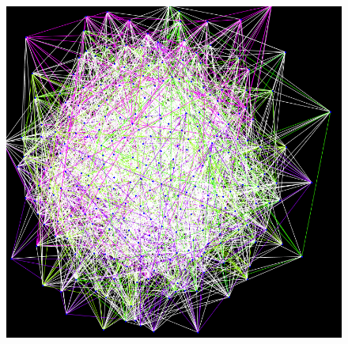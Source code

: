 \begin{figure}
\centering \includegraphics[scale=0.3]{uuf030.png}
\caption{}\label{}
\end{figure}



